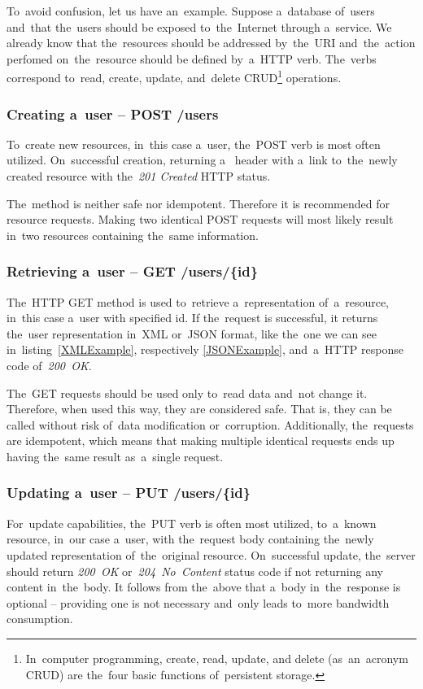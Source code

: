 To~avoid confusion, let us have an~example. Suppose a~database
of~users and~that the~users should be exposed to~the~Internet through a~service.
We already know that the~resources should be addressed by~the~URI and~the~action
perfomed on~the~resource should be defined by~a~HTTP verb. The~verbs correspond
to~read, create, update, and~delete CRUD\footnote{In~computer programming,
create, read, update, and delete (as~an~acronym CRUD) are the~four basic
functions of~persistent storage.} operations.

\subsubsection{Creating a~user -- POST /users}
To~create new resources, in~this case a~user, the~POST verb is most often
utilized. On~successful creation, returning a~ header with a~link
to~the~newly created resource with the~\textit{201 Created} HTTP status.

The~method is neither safe nor idempotent. Therefore it is recommended
for~ resource requests. Making two identical POST requests
will most likely result in~two resources containing the~same information.

\subsubsection{Retrieving a~user -- GET /users/\{id\}}
The~HTTP GET method is used to~retrieve a~representation of~a~resource, in~this
case a~user with specified id. If the~request is successful, it returns the~user
representation in~XML or~JSON format, like the~one we can see
in~listing~\ref{XMLExample}, respectively \ref{JSONExample},
and~a~HTTP response code of~\textit{200~OK}.

The~GET requests should be used only to~read data and~not change it. Therefore,
when used this way, they are considered safe. That is, they can be called
without risk of~data modification or~corruption. Additionally, the~requests are
idempotent, which means that making multiple identical requests ends up having
the~same result as~a~single request.

\subsubsection{Updating a~user -- PUT /users/\{id\}}
For~update capabilities, the~PUT verb is often most utilized, 
to~a~known resource, in~our case a~user, with the~request body containing
the~newly updated representation of~the~original resource. On~successful update,
the~server should return \textit{200~OK} or~\textit{204~No~Content} status code
if not returning any content in~the~body. It follows from the~above that a~body in~the~response
is optional -- providing one is not necessary and~only leads to~more
bandwidth consumption.

